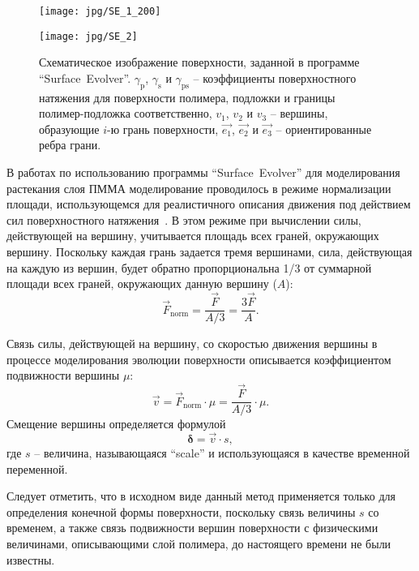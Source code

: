 \begin{figure}
	\begin{minipage}{0.55\textwidth}
		\texttt{[image: jpg/SE\_1\_200]}
	\end{minipage}
	\begin{minipage}{0.4\textwidth}
		\texttt{[image: jpg/SE\_2]}
	\end{minipage}
	\vspace{0.5em}
	\caption{Схематическое изображение поверхности, заданной в программе ``Surface~Evolver''. $\gamma_\mathrm{p}$, $\gamma_\mathrm{s}$ и $\gamma_\mathrm{ps}$ -- коэффициенты поверхностного натяжения для поверхности полимера, подложки и границы полимер-подложка соответственно, $v_1$, $v_2$ и $v_3$ -- вершины, образующие $i$-ю грань поверхности, $\vec{e_1}$, $\vec{e_2}$ и $\vec{e_3}$ -- ориентированные ребра грани.}
	\label{fig:SE_12}
\end{figure}

В работах по использованию программы ``Surface~Evolver'' для моделирования растекания слоя ПММА моделирование проводилось в режиме нормализации площади, использующемся для реалистичного описания движения под действием сил поверхностного натяжения~\cite{Kirchner_reflow}. В этом режиме при вычислении силы, действующей на вершину, учитывается площадь всех граней, окружающих вершину. Поскольку каждая грань задается тремя вершинами,
сила, действующая на каждую из вершин, будет обратно пропорциональна 1/3 от суммарной площади всех граней, окружающих данную вершину ($A$):
\begin{equation}
	\vec{F}_\mathrm{norm} = \frac{\vec{F}}{A/3} = \frac{3\vec{F}}{A}.
\end{equation}

Связь силы, действующей на вершину, со скоростью движения вершины в процессе моделирования эволюции поверхности описывается коэффициентом подвижности вершины $\mu$:
\begin{equation} \label{eq:SE_v}
	\vec{v} = \vec{F}_\mathrm{norm} \cdot \mu = \frac{\vec{F}}{A/3} \cdot \mu.
\end{equation}
Смещение вершины определяется формулой
\begin{equation} \label{eq:SE_delta}
	\boldsymbol{\delta} = \vec{v} \cdot s,
\end{equation}
где $s$ -- величина, называющаяся ``scale'' и использующаяся в качестве временной переменной.

Следует отметить, что в исходном виде данный метод применяется только для определения конечной формы поверхности, поскольку связь величины $s$ со временем, а также связь подвижности вершин поверхности с физическими величинами, описывающими слой полимера, до настоящего времени не были известны.


